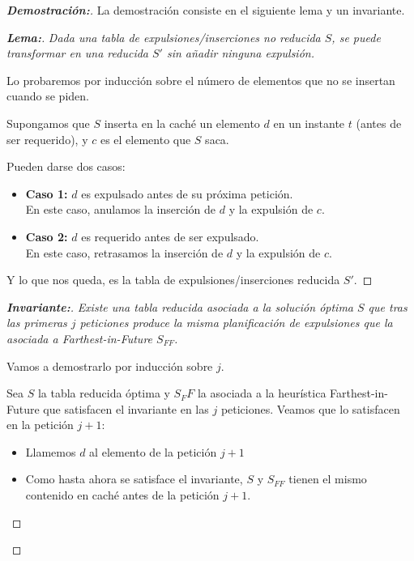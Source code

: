 \documentclass[a4paper, 11pt]{article} %
\begin{document}
  \begin{proof}[\textbf{Demostración:}]
  	La demostración consiste en el siguiente lema y un invariante.
  
	  \begin{proof}[\textbf{Lema:}]
	    \textit{
	      Dada una tabla de expulsiones/inserciones no reducida $S$, se puede transformar en una reducida $S'$ sin añadir ninguna expulsión.
	    }
	    
	    Lo probaremos por inducción sobre el número de elementos que no se insertan cuando se piden.
	    
	    Supongamos que $S$ inserta en la caché un elemento $d$ en un instante $t$ (antes de ser requerido), y $c$
	    es el elemento que $S$ saca.
	    
	    Pueden darse dos casos:
	    \begin{itemize}
	      \item \textbf{Caso 1: } $d$ es expulsado antes de su próxima petición.\\
	      En este caso, anulamos la inserción de $d$ y la expulsión de $c$.
	      \item \textbf{Caso 2: } $d$ es requerido antes de ser expulsado. \\
	      En este caso, retrasamos la inserción de $d$ y la expulsión de $c$.
	    \end{itemize}
	    
	    Y lo que nos queda, es la tabla de expulsiones/inserciones reducida $S'$.
	    
	  \end{proof}
	
	\begin{proof}[\textbf{Invariante:}]
	  \textit{
	    Existe una tabla reducida asociada a la solución óptima $S$ que tras las primeras $j$ peticiones produce la misma planificación de expulsiones que la asociada a Farthest-in-Future $S_{FF}$.
	  }
	  
	  Vamos a demostrarlo por inducción sobre $j$.
	  
	  Sea $S$ la tabla reducida óptima y $S_FF$ la asociada a la heurística Farthest-in-Future que satisfacen el invariante en las $j$ peticiones.
	  Veamos que lo satisfacen en la petición $j+1$:
	  
	  \begin{itemize}
	  	\item Llamemos $d$ al elemento de la petición $j+1$
	  	\item Como hasta ahora se satisface el invariante, $S$ y $S_{FF}$ tienen el mismo contenido en caché antes de la petición $j+1$.
	  

\end{itemize}
\end{proof}
\end{proof}
\end{document}
